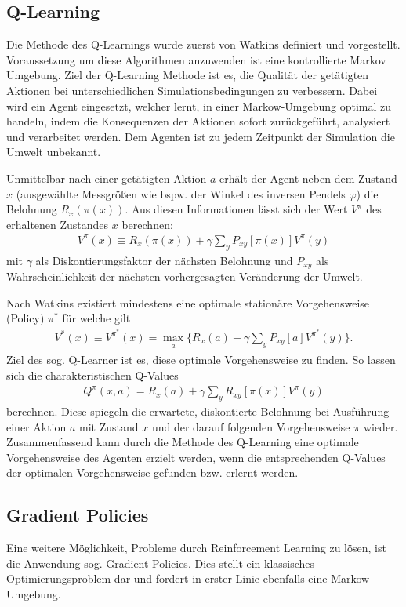 	\subsection{Q-Learning}
	\label{subsec:rl_qlearning}
		Die Methode des Q-Learnings wurde zuerst von Watkins \cite{Watkins1992} definiert und vorgestellt. Voraussetzung um diese Algorithmen anzuwenden ist eine kontrollierte Markov Umgebung. Ziel der Q-Learning Methode ist es, die Qualität der getätigten Aktionen bei unterschiedlichen Simulationsbedingungen zu verbessern. Dabei wird ein Agent eingesetzt, welcher lernt, in einer Markow-Umgebung optimal zu handeln, indem die Konsequenzen der Aktionen sofort zurückgeführt, analysiert und verarbeitet werden. Dem Agenten ist zu jedem Zeitpunkt der Simulation die Umwelt unbekannt.
		
		Unmittelbar nach einer getätigten Aktion $a$ erhält der Agent neben dem Zustand $x$ (ausgewählte Messgrößen wie bspw. der Winkel des inversen Pendels $\varphi$) die Belohnung $R_x(\pi(x))$. Aus diesen Informationen lässt sich der Wert $V^\pi$ des erhaltenen Zustandes $x$ berechnen:
		\begin{align}
			V^\pi(x) \equiv R_x(\pi(x)) + \gamma \sum_{y}P_{xy}[\pi(x)]V^\pi(y)
		\end{align}
		mit $\gamma$ als Diskontierungsfaktor der nächsten Belohnung und $P_{xy}$ als Wahrscheinlichkeit der nächsten vorhergesagten Veränderung der Umwelt.
		
		Nach Watkins existiert mindestens eine optimale stationäre Vorgehensweise (\glqq Policy\grqq) $\pi^*$ für welche gilt
		\begin{align}
			V^*(x) \equiv V^{\pi^*}(x) = \max_{\substack{a}} \bigg\{R_x(a) + \gamma \sum_{y}P_{xy}[a]V^{\pi^*}(y)\bigg\}.
		\end{align}
		Ziel des sog. \glqq Q-Learner\grqq{} ist es, diese optimale Vorgehensweise zu finden. So lassen sich die charakteristischen Q-Values
		\begin{align}
			Q^\pi(x,a) = R_x(a) + \gamma \sum_{y}R_{xy}[\pi(x)]V^\pi(y)
		\end{align}
		berechnen. Diese spiegeln die erwartete, diskontierte Belohnung bei Ausführung einer Aktion $a$ mit Zustand $x$ und der darauf folgenden Vorgehensweise $\pi$ wieder. Zusammenfassend kann durch die Methode des Q-Learning eine optimale Vorgehensweise des Agenten erzielt werden, wenn die entsprechenden Q-Values der optimalen Vorgehensweise gefunden bzw. erlernt werden.
	
	\subsection{Gradient Policies}
		Eine weitere Möglichkeit, Probleme durch Reinforcement Learning zu lösen, ist die Anwendung sog. \glqq Gradient Policies\grqq{}. Dies stellt ein klassisches Optimierungsproblem dar und fordert in erster Linie ebenfalls eine Markow-Umgebung.
		
